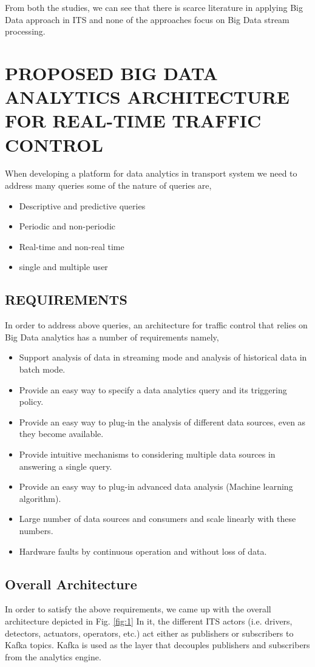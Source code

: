 \documentclass[sigconf]{acmart}
\begin{document}
From both the studies, we can see that there is scarce literature in applying Big Data approach in ITS and none of the approaches focus on Big Data stream processing.
    
\section{PROPOSED BIG DATA ANALYTICS ARCHITECTURE FOR
REAL-TIME TRAFFIC CONTROL}
When developing a platform for data analytics in transport system we need to address many queries some of the nature of queries are, 
\begin{itemize}
\item Descriptive and predictive queries
\item Periodic and non-periodic
\item Real-time and non-real time
\item single and multiple user
\end{itemize}
\subsection{REQUIREMENTS}
In order to address above queries, an architecture for traffic control that relies on Big Data analytics has a number of requirements namely,
\begin{itemize}
\item Support analysis of data in streaming mode and analysis of historical data in batch mode.
\item Provide an easy way to specify a data analytics query and its triggering policy.
\item Provide an easy way to plug-in the analysis of different data sources, even as they become available.
\item Provide intuitive mechanisms to considering multiple data sources in answering a single query.
\item Provide an easy way to plug-in advanced data analysis (Machine learning algorithm).
\item Large number of data sources and consumers and scale linearly with these numbers.
\item Hardware faults by continuous operation and without loss of data.
\end{itemize}
\subsection{Overall Architecture}
In order to satisfy the above requirements, we came up with the overall architecture depicted in Fig. \ref{fig:1} In it, the different ITS actors (i.e. drivers, detectors, actuators, operators, etc.) act either as publishers or subscribers to Kafka topics. Kafka is used as the layer that decouples publishers and subscribers from the analytics engine. 
\end{document}

